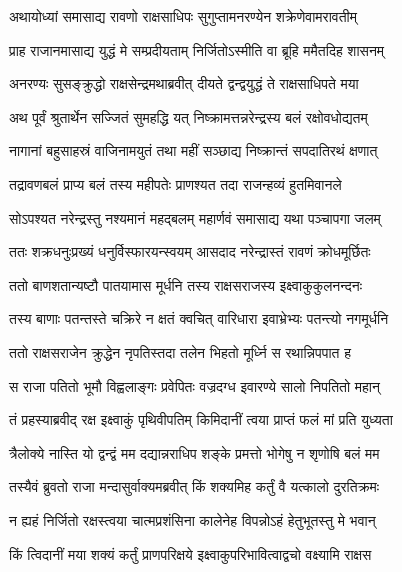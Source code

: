 \twolineshloka
{अथायोध्यां समासाद्य रावणो राक्षसाधिपः}
{सुगुप्तामनरण्येन शक्रेणेवामरावतीम्} %

\twolineshloka
{प्राह राजानमासाद्य युद्धं मे सम्प्रदीयताम्}
{निर्जितोऽस्मीति वा ब्रूहि ममैतदिह शासनम्} %

\twolineshloka
{अनरण्यः सुसङ्क्रुद्धो राक्षसेन्द्रमथाब्रवीत्}
{दीयते द्वन्द्वयुद्धं ते राक्षसाधिपते मया} %

\twolineshloka
{अथ पूर्वं श्रुतार्थेन सज्जितं सुमहद्धि यत्}
{निष्क्रामत्तन्नरेन्द्रस्य बलं रक्षोवधोद्यतम्} %

\twolineshloka
{नागानां बहुसाहस्रं वाजिनामयुतं तथा}
{महीं सञ्छाद्य निष्क्रान्तं सपदातिरथं क्षणात्} %

\twolineshloka
{तद्रावणबलं प्राप्य बलं तस्य महीपतेः}
{प्राणश्यत तदा राजन्हव्यं हुतमिवानले} %

\twolineshloka
{सोऽपश्यत नरेन्द्रस्तु नश्यमानं महद्बलम्}
{महार्णवं समासाद्य यथा पञ्चापगा जलम्} %

\twolineshloka
{ततः शक्रधनुःप्रख्यं धनुर्विस्फारयन्स्वयम्}
{आसदाद नरेन्द्रास्तं रावणं क्रोधमूर्छितः} %

\twolineshloka
{ततो बाणशतान्यष्टौ पातयामास मूर्धनि}
{तस्य राक्षसराजस्य इक्ष्वाकुकुलनन्दनः} %

\twolineshloka
{तस्य बाणाः पतन्तस्ते चक्रिरे न क्षतं क्वचित्}
{वारिधारा इवाभ्रेभ्यः पतन्त्यो नगमूर्धनि} %

\twolineshloka
{ततो राक्षसराजेन क्रुद्धेन नृपतिस्तदा}
{तलेन भिहतो मूर्ध्नि स रथान्निपपात ह} %

\twolineshloka
{स राजा पतितो भूमौ विह्वलाङ्गः प्रवेपितः}
{वज्रदग्ध इवारण्ये सालो निपतितो महान्} %

\twolineshloka
{तं प्रहस्याब्रवीद् रक्ष इक्ष्वाकुं पृथिवीपतिम्}
{किमिदानीं त्वया प्राप्तं फलं मां प्रति युध्यता} %

\twolineshloka
{त्रैलोक्ये नास्ति यो द्वन्द्वं मम दद्यान्नराधिप}
{शङ्के प्रमत्तो भोगेषु न शृणोषि बलं मम} %

\twolineshloka
{तस्यैवं ब्रुवतो राजा मन्दासुर्वाक्यमब्रवीत्}
{किं शक्यमिह कर्तुं वै यत्कालो दुरतिक्रमः} %

\twolineshloka
{न ह्यहं निर्जितो रक्षस्त्वया चात्मप्रशंसिना}
{कालेनेह विपन्नोऽहं हेतुभूतस्तु मे भवान्} %

\twolineshloka
{किं त्विदानीं मया शक्यं कर्तुं प्राणपरिक्षये}
{इक्ष्वाकुपरिभावित्वाद्वचो वक्ष्यामि राक्षस} %

